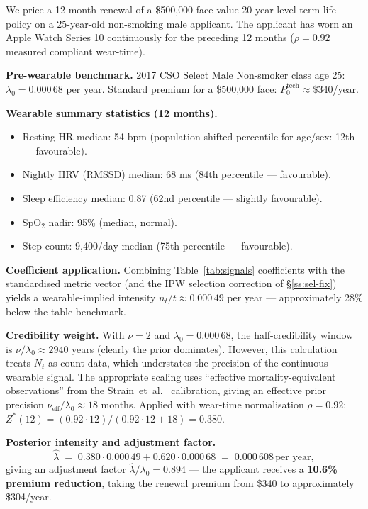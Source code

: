 \documentclass[11pt,a4paper]{article}
\theoremstyle{ia}
\newcommand{\1}{\mathbf{1}}
\begin{document}
\begin{ebox}
We price a 12-month renewal of a \$500{,}000 face-value 20-year level
term-life policy on a 25-year-old non-smoking male applicant. The
applicant has worn an Apple Watch Series 10 continuously for the
preceding 12 months ($\rho=0.92$ measured compliant wear-time).

\textbf{Pre-wearable benchmark.} 2017 CSO Select Male Non-smoker
class age 25: $\lambda_0 = 0.000\,68$ per year. Standard premium for
a \$500{,}000 face: $P^{\mathrm{tech}}_0 \approx \$340$/year.

\textbf{Wearable summary statistics (12 months).}
\begin{itemize}[leftmargin=*,nosep]
   \item Resting HR median: 54 bpm (population-shifted percentile
         for age/sex: 12th --- favourable).
   \item Nightly HRV (RMSSD) median: 68 ms (84th percentile ---
         favourable).
   \item Sleep efficiency median: 0.87 (62nd percentile ---
         slightly favourable).
   \item SpO$_2$ nadir: 95\% (median, normal).
   \item Step count: 9{,}400/day median (75th percentile ---
         favourable).
\end{itemize}

\textbf{Coefficient application.} Combining
Table~\ref{tab:signals} coefficients with the standardised
metric vector (and the IPW selection correction of
\S\ref{ss:sel-fix}) yields a wearable-implied intensity
$n_t/t \approx 0.000\,49$ per year --- approximately 28\% below the
table benchmark.

\textbf{Credibility weight.} With $\nu=2$ and $\lambda_0=0.000\,68$,
the half-credibility window is $\nu/\lambda_0 \approx
2940$ years (clearly the prior dominates). However, this calculation
treats $N_t$ as count data, which understates the precision of the
continuous wearable signal. The appropriate scaling
uses ``effective mortality-equivalent observations'' from the
Strain~et~al.\ \cite{Strain2020} calibration, giving an effective
prior precision $\nu_{\mathrm{eff}}/\lambda_0 \approx 18$ months.
Applied with wear-time normalisation $\rho=0.92$:
$Z^*(12) = (0.92\cdot 12)/(0.92\cdot 12 + 18) = 0.380$.

\textbf{Posterior intensity and adjustment factor.}
\[
   \hat\lambda \;=\; 0.380\cdot 0.000\,49 + 0.620\cdot 0.000\,68
                \;=\; 0.000\,608\,\text{per year},
\]
giving an adjustment factor
$\hat\lambda/\lambda_0 = 0.894$ --- the applicant receives a
\textbf{10.6\% premium reduction}, taking the renewal premium from
\$340 to approximately \$304/year.


\end{ebox}
\end{document}

